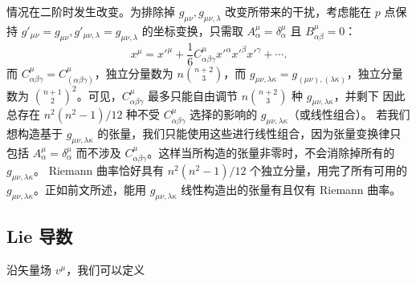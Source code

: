 情况在二阶时发生改变。为排除掉 $g_{\mu\nu},g_{\mu\nu,\lambda}$ 改变所带来的干扰，考虑能在 $p$ 点保持 $g'_{\mu\nu}= g_{\mu\nu}, g'_{\mu\nu,\lambda}=g_{\mu\nu,\lambda}$ 的坐标变换，只需取 $A^\mu_\alpha=\delta^\mu_\alpha$ 且 $B^\mu_{\alpha\beta}=0$：
\[x^\mu=x'^\mu + \frac 16 C^\mu_{\alpha\beta\gamma} x'^\alpha x'^\beta x'^\gamma+\cdots.\]
而 $C^\mu_{\alpha\beta\gamma}=C^\mu_{(\alpha\beta\gamma)}$，独立分量数为 $n\binom {n+2}{3}$，而 $g_{\mu\nu,\lambda\kappa}=g_{(\mu\nu),(\lambda\kappa)}$，独立分量数为 ${\binom {n+1}{2}}^2$。可见，$C^\mu_{\alpha\beta\gamma}$ 最多只能自由调节 $n\binom {n+2}{3}$ 种 $g_{\mu\nu,\lambda\kappa}$，并剩下
因此总存在 ${n^2(n^2-1)}/{12}$ 种不受 $C^\mu_{\alpha\beta\gamma}$ 选择的影响的 $g_{\mu\nu,\lambda\kappa}$（或线性组合）。
若我们想构造基于 $g_{\mu\nu,\lambda\kappa}$ 的张量，我们只能使用这些进行线性组合，因为张量变换律只包括 $A^\mu_\alpha=\delta^\mu_\alpha$ 而不涉及 $C^\mu_{\alpha\beta\gamma}$。这样当所构造的张量非零时，不会消除掉所有的 $g_{\mu\nu,\lambda\kappa}$。
Riemann 曲率恰好具有 ${n^2(n^2-1)}/{12}$ 个独立分量，用完了所有可用的 $g_{\mu\nu,\lambda\kappa}$。正如前文所述，能用 $g_{\mu\nu,\lambda\kappa}$ 线性构造出的张量有且仅有 Riemann 曲率。


\subsection{Lie 导数}


沿矢量场 $v^\mu$，我们可以定义

